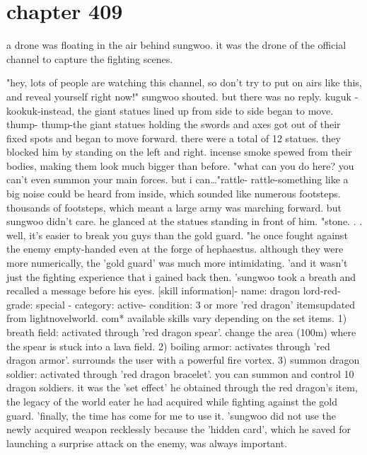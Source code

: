 \section{chapter 409}

a drone was floating in the air behind sungwoo.
 it was the drone of the official channel to capture the fighting scenes.





"hey, lots of people are watching this channel, so don't try to put on airs like this, and reveal yourself right now!" sungwoo shouted.
but there was no reply.
 kuguk - kookuk-instead, the giant statues lined up from side to side began to move.
thump- thump-the giant statues holding the swords and axes got out of their fixed spots and began to move forward.
 there were a total of 12 statues.
 they blocked him by standing on the left and right.
 incense smoke spewed from their bodies, making them look much bigger than before.
"what can you do here? you can't even summon your main forces.
 but i can…"rattle- rattle-something like a big noise could be heard from inside, which sounded like numerous footsteps.
 thousands of footsteps, which meant a large army was marching forward.
 but sungwoo didn't care.
 he glanced at the statues standing in front of him.
"stone.
.
.
well, it's easier to break you guys than the gold guard.
"he once fought against the enemy empty-handed even at the forge of hephaestus.
although they were more numerically, the 'gold guard' was much more intimidating.
'and it wasn't just the fighting experience that i gained back then.
'sungwoo took a breath and recalled a message before his eyes.
[skill information]- name: dragon lord-red- grade: special
- category: active- condition: 3 or more 'red dragon' itemsupdated from lightnov‌elworld.
c‌om* available skills vary depending on the set items.
1) breath field: activated through 'red dragon spear'.
 change the area (100m) where the spear is stuck into a lava field.
2) boiling armor: activates through 'red dragon armor'.
 surrounds the user with a powerful fire vortex.
3) summon dragon soldier: activated through 'red dragon bracelet'.
 you can summon and control 10 dragon soldiers.
it was the 'set effect' he obtained through the red dragon's item, the legacy of the world eater he had acquired while fighting against the gold guard.
'finally, the time has come for me to use it.
'sungwoo did not use the newly acquired weapon recklessly because the 'hidden card', which he saved for launching a surprise attack on the enemy, was always important.
